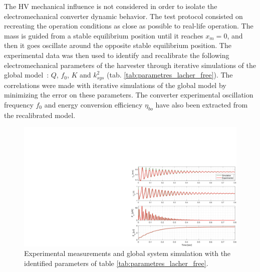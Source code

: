 \documentclass[3p,twocolumn,preprint]{elsarticle}
\begin{document}
The HV mechanical influence is not considered in order to isolate the electromechanical converter dynamic behavior. The test protocol consisted on recreating the operation conditions as close as possible to real-life operation. The mass is guided from a stable equilibrium position until it reaches \mbox{$x_m=0$}, and then it goes oscillate around the opposite stable equilibrium position. The experimental data was then used to identify and recalibrate the following electromechanical parameters of the harvester through iterative simulations of the global \mbox{model :} $Q$, $f_0$, $K$ and $k_{sys}^2$ (tab. \ref{tab:parametres_lacher_free}). The correlations were made with iterative simulations of the global model by minimizing the error on these parameters. The converter experimental oscillation frequency $f_0$ and energy conversion efficiency $\eta_{bo}$ have also been extracted from the recalibrated model.

\begin{figure}[!htbp]
	\centering
	\captionsetup{justification=centering}
	\includegraphics[trim={17cm 0cm 0cm 6cm},clip,width=\linewidth]{figures/correlation_simu-exp_OB+GPA.pdf}
	\caption{Experimental measurements and global system simulation with the identified parameters of table \ref{tab:parametres_lacher_free}.}
	\label{fig:BDT_OB+GPA}
\end{figure}
\end{document}
